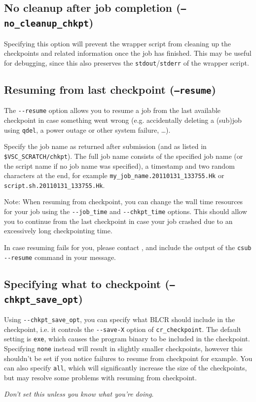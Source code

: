 \subsection{No cleanup after job completion (\texttt{--no\_cleanup\_chkpt})}

Specifying this option will prevent the wrapper script from cleaning up the
checkpoints and related information once the job has finished. This may be useful
for debugging, since this also preserves the \lstinline|stdout|/\lstinline|stderr|
of the wrapper script.

\subsection{Resuming from last checkpoint (\texttt{--resume})}

The \lstinline|--resume| option allows you to resume a job from the
last available checkpoint in case something went wrong
(e.g. accidentally deleting a (sub)job using \lstinline|qdel|, a power outage or other system failure, \ldots).

Specify the job name as returned after submission (and as listed in \texttt{\$VSC\_SCRATCH/chkpt}).
The full job name consists of the specified job name (or the script name if no job name was specified),
a timestamp and two random characters at the end, for example \lstinline|my_job_name.20110131_133755.Hk|
or \lstinline|script.sh.20110131_133755.Hk|.

Note: When resuming from checkpoint, you can change the wall time resources for your job using the \lstinline{--job_time} and
\lstinline|--chkpt_time| options. This should allow you to continue from the last checkpoint
in case your job crashed due to an excessively long checkpointing time.

In case resuming fails for you, please contact \hpcinfo, and include the output
of the \lstinline|csub --resume| command in your message.

\subsection{Specifying what to checkpoint (\texttt{--chkpt\_save\_opt})}

Using \lstinline|--chkpt_save_opt|, you can specify what BLCR should include in
the checkpoint, i.e. it controls the \lstinline|--save-X| option of \lstinline|cr_checkpoint|.
The default setting is \lstinline|exe|, which causes the program binary to be included in the
checkpoint. Specifying \lstinline|none| instead will result in slightly smaller checkpoints,
however this shouldn't be set if you notice failures to resume from checkpoint
for example. You can also specify \lstinline|all|, which will significantly increase the size
of the checkpoints, but may resolve some problems with resuming from checkpoint.

\emph{Don't set this unless you know what you're doing}.
